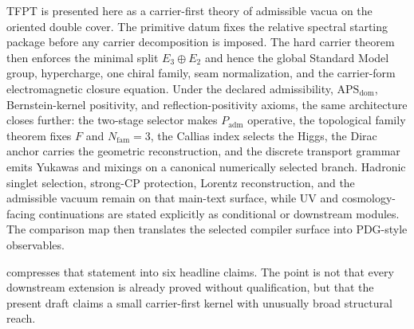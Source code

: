 \documentclass[11pt,a4paper]{article}
\theoremstyle{definition}
\theoremstyle{remark}
\newcommand{\APSdom}{\mathrm{APS}_{\mathrm{dom}}}
\newcommand{\Padm}{P_{\mathrm{adm}}}
\begin{document}
TFPT is presented here as a carrier-first theory of admissible vacua on the oriented double cover. The primitive datum fixes the relative spectral starting package before any carrier decomposition is imposed. The hard carrier theorem then enforces the minimal split $E_3\oplus E_2$ and hence the global Standard Model group, hypercharge, one chiral family, seam normalization, and the carrier-form electromagnetic closure equation. Under the declared admissibility, $\APSdom$, Bernstein-kernel positivity, and reflection-positivity axioms, the same architecture closes further: the two-stage selector makes $\Padm$ operative, the topological family theorem fixes $F$ and $N_{\mathrm{fam}}=3$, the Callias index selects the Higgs, the Dirac anchor carries the geometric reconstruction, and the discrete transport grammar emits Yukawas and mixings on a canonical numerically selected branch. Hadronic singlet selection, strong-CP protection, Lorentz reconstruction, and the admissible vacuum remain on that main-text surface, while UV and cosmology-facing continuations are stated explicitly as conditional or downstream modules. The comparison map then translates the selected compiler surface into PDG-style observables.

 compresses that statement into six headline claims. The point is
not that every downstream extension is already proved without qualification, but that the present
draft claims a small carrier-first kernel with unusually broad structural reach.
\end{document}
